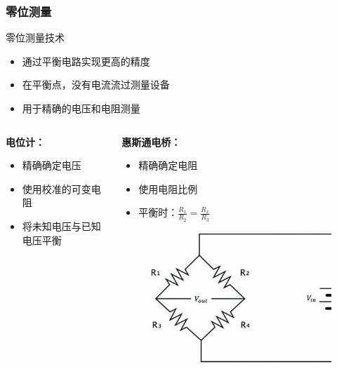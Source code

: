 \documentclass{beamer}
\begin{document}
\begin{frame}
    \frametitle{零位测量}
    \begin{block}{零位测量技术}
        \begin{itemize}
            \item 通过平衡电路实现更高的精度
            \item 在平衡点，没有电流流过测量设备
            \item 用于精确的电压和电阻测量
        \end{itemize}
    \end{block}
    \begin{columns}
        \begin{column}{0.5\textwidth}
            \textbf{电位计：}
            \begin{itemize}
                \item 精确确定电压
                \item 使用校准的可变电阻
                \item 将未知电压与已知电压平衡
            \end{itemize}
        \end{column}
        \begin{column}{0.5\textwidth}
            \textbf{惠斯通电桥：}
            \begin{itemize}
                \item 精确确定电阻
                \item 使用电阻比例
                \item 平衡时：$\frac{R_1}{R_2} = \frac{R_x}{R_3}$
            \end{itemize}
            \begin{figure}
                \centering
                \includegraphics[width=0.5\linewidth]{phys12-circuits-wheatstone-bridge.jpg}
            \end{figure}
        \end{column}
    \end{columns}
\end{frame}
\end{document}
